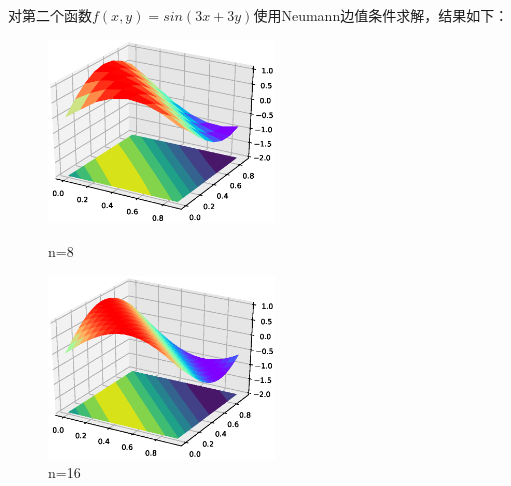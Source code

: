 \documentclass[12]{article}%
\begin{document}
对第二个函数$f(x,y)=sin(3x+3y)$使用Neumann边值条件求解，结果如下：
\begin{figure}[H]
    \centering
    \begin{minipage}[t]{0.48\textwidth}
    \centering
    \includegraphics[width=6cm]{../pic/fun28.eps}
    \caption{n=8}
    \end{minipage}
    \begin{minipage}[t]{0.48\textwidth}
    \centering
    \includegraphics[width=6cm]{../pic/fun216.eps}
    \caption{n=16}
    \end{minipage}
\end{figure}
\end{document}
